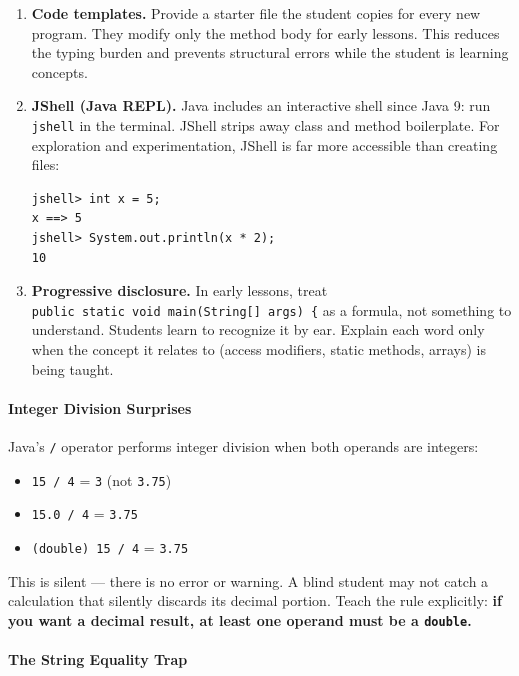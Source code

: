 \documentclass[
  justified,
  openright,
]{tufte-book}
\let\subsubsection\paragraph
\let\paragraph\paragraph
\let\subsubsection\paragraph
\let\paragraph\paragraph
\providecommand{\tightlist}{%
  \setlength{\itemsep}{0pt}\setlength{\parskip}{0pt}}
\begin{document}
\begin{enumerate}
\def\labelenumi{\arabic{enumi}.}
\item
  \textbf{Code templates.} Provide a starter file the student copies for
  every new program. They modify only the method body for early lessons.
  This reduces the typing burden and prevents structural errors while
  the student is learning concepts.
\item
  \textbf{JShell (Java REPL).} Java includes an interactive shell since
  Java 9: run \texttt{jshell} in the terminal. JShell strips away class
  and method boilerplate. For exploration and experimentation, JShell is
  far more accessible than creating files:

\begin{verbatim}
jshell> int x = 5;
x ==> 5
jshell> System.out.println(x * 2);
10
\end{verbatim}
\item
  \textbf{Progressive disclosure.} In early lessons, treat
  \texttt{public\ static\ void\ main(String{[}{]}\ args)\ \{} as a
  formula, not something to understand. Students learn to recognize it
  by ear. Explain each word only when the concept it relates to (access
  modifiers, static methods, arrays) is being taught.
\end{enumerate}

\subsubsection{Integer Division
Surprises}\label{integer-division-surprises}

Java's \texttt{/} operator performs integer division when both operands
are integers:

\begin{itemize}
\tightlist
\item
  \texttt{15\ /\ 4} = \texttt{3} (not \texttt{3.75})
\item
  \texttt{15.0\ /\ 4} = \texttt{3.75}
\item
  \texttt{(double)\ 15\ /\ 4} = \texttt{3.75}
\end{itemize}

This is silent --- there is no error or warning. A blind student may not
catch a calculation that silently discards its decimal portion. Teach
the rule explicitly: \textbf{if you want a decimal result, at least one
operand must be a \texttt{double}.}

\subsubsection{The String Equality Trap}\label{the-string-equality-trap}
\end{document}
